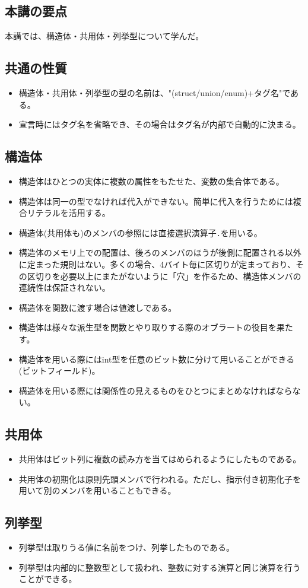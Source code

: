 \begin{shadebox}
\section*{本講の要点}
本講では、構造体・共用体・列挙型について学んだ。

\subsection*{共通の性質}
\begin{itemize}
\item 構造体・共用体・列挙型の型の名前は、"(struct/union/enum)+タグ名"である。
\item 宣言時にはタグ名を省略でき、その場合はタグ名が内部で自動的に決まる。
\end{itemize}

\subsection*{構造体}
\begin{itemize}
\item 構造体はひとつの実体に複数の属性をもたせた、変数の集合体である。
\item 構造体は同一の型でなければ代入ができない。簡単に代入を行うためには複合リテラルを活用する。
\item 構造体(共用体も)のメンバの参照には直接選択演算子\verb|.|を用いる。
\item 構造体のメモリ上での配置は、後ろのメンバのほうが後側に配置される以外に定まった規則はない。多くの場合、4バイト毎に区切りが定まっており、その区切りを必要以上にまたがないように「穴」を作るため、構造体メンバの連続性は保証されない。
\item 構造体を関数に渡す場合は値渡しである。
\item 構造体は様々な派生型を関数とやり取りする際のオブラートの役目を果たす。
\item 構造体を用いる際にはint型を任意のビット数に分けて用いることができる(ビットフィールド)。
\item 構造体を用いる際には関係性の見えるものをひとつにまとめなければならない。
\end{itemize}

\subsection*{共用体}
\begin{itemize}
\item 共用体はビット列に複数の読み方を当てはめられるようにしたものである。
\item 共用体の初期化は原則先頭メンバで行われる。ただし、指示付き初期化子を用いて別のメンバを用いることもできる。
\end{itemize}

\subsection*{列挙型}
\begin{itemize}
\item 列挙型は取りうる値に名前をつけ、列挙したものである。
\item 列挙型は内部的に整数型として扱われ、整数に対する演算と同じ演算を行うことができる。
\end{itemize}
\end{shadebox}
